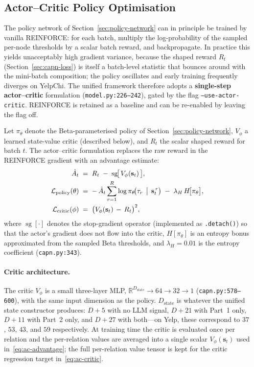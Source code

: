 \subsection{Actor--Critic Policy Optimisation}
\label{sec:actor-critic}

The policy network of Section~\ref{sec:policy-network} can in principle be trained by vanilla REINFORCE: for each batch, multiply the log-probability of the sampled per-node thresholds by a scalar batch reward, and backpropagate. In practice this yields unacceptably high gradient variance, because the shaped reward $R_t$ (Section~\ref{sec:capn-loss}) is itself a batch-level statistic that bounces around with the mini-batch composition; the policy oscillates and early training frequently diverges on YelpChi. The unified framework therefore adopts a \textbf{single-step actor--critic} formulation (\texttt{model.py:226--242}), gated by the flag \texttt{--use-actor-critic}. REINFORCE is retained as a baseline and can be re-enabled by leaving the flag off.

Let $\pi_\theta$ denote the Beta-parameterised policy of Section~\ref{sec:policy-network}, $V_\phi$ a learned state-value critic (described below), and $R_t$ the scalar shaped reward for batch $t$. The actor--critic formulation replaces the raw reward in the REINFORCE gradient with an advantage estimate:
\begin{align}
    \hat{A}_t &\;=\; R_t \;-\; \operatorname{sg}\!\bigl[\, V_\phi(\mathbf{s}_t) \,\bigr],
    \label{eq:ac-advantage} \\
    \mathcal{L}_{\text{policy}}(\theta) &\;=\; -\,\hat{A}_t \sum_{r=1}^{R} \log \pi_\theta\!\bigl( \tau_r \,\bigm|\, \mathbf{s}_t^{\,r} \bigr)
        \;-\; \lambda_{H}\, H\!\bigl[\pi_\theta\bigr],
    \label{eq:ac-policy} \\
    \mathcal{L}_{\text{critic}}(\phi) &\;=\; \bigl( V_\phi(\mathbf{s}_t) \,-\, R_t \bigr)^{2},
    \label{eq:ac-critic}
\end{align}
where $\operatorname{sg}[\cdot]$ denotes the stop-gradient operator (implemented as \texttt{.detach()}) so that the actor's gradient does not flow into the critic, $H[\pi_\theta]$ is an entropy bonus approximated from the sampled Beta thresholds, and $\lambda_H = 0.01$ is the entropy coefficient (\texttt{capn.py:343}).

\paragraph{Critic architecture.} The critic $V_\phi$ is a small three-layer MLP, $\mathbb{R}^{D_{\text{state}}} \to 64 \to 32 \to 1$ (\texttt{capn.py:578--600}), with the same input dimension as the policy. $D_{\text{state}}$ is whatever the unified state constructor produces: $D + 5$ with no LLM signal, $D + 21$ with Part~1 only, $D + 11$ with Part~2 only, and $D + 27$ with both---on Yelp, these correspond to $37$, $53$, $43$, and $59$ respectively. At training time the critic is evaluated once per relation and the per-relation values are averaged into a single scalar $V_\phi(\mathbf{s}_t)$ used in~\eqref{eq:ac-advantage}; the full per-relation value tensor is kept for the critic regression target in~\eqref{eq:ac-critic}.

